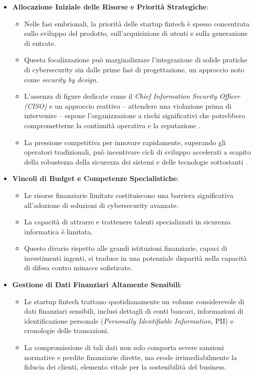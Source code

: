 \begin{itemize}
    \item \textbf{Allocazione Iniziale delle Risorse e Priorità Strategiche}: 
    \begin{itemize}
        \item Nelle fasi embrionali, la priorità delle startup fintech è spesso concentrata sullo sviluppo del prodotto, sull'acquisizione di utenti e sulla generazione di entrate.
        \item Questa focalizzazione può marginalizzare l'integrazione di solide pratiche di cybersecurity sin dalle prime fasi di progettazione, un approccio noto come \textit{security by design}.
        \item L'assenza di figure dedicate come il \textit{Chief Information Security Officer (CISO)} e un approccio reattivo – attendere una violazione prima di intervenire – espone l'organizzazione a rischi significativi che potrebbero comprometterne la continuità operativa e la reputazione \cite{Kaur2021}.
        \item La pressione competitiva per innovare rapidamente, superando gli operatori tradizionali, può incentivare cicli di sviluppo accelerati a scapito della robustezza della sicurezza dei sistemi e delle tecnologie sottostanti \cite{dasawat2023cyber}.
    \end{itemize}
    
    \item \textbf{Vincoli di Budget e Competenze Specialistiche}:
    \begin{itemize}
        \item Le risorse finanziarie limitate costituiscono una barriera significativa all'adozione di soluzioni di cybersecurity avanzate.
        \item La capacità di attrarre e trattenere talenti specializzati in sicurezza informatica è limitata.
        \item Questo divario rispetto alle grandi istituzioni finanziarie, capaci di investimenti ingenti, si traduce in una potenziale disparità nella capacità di difesa contro minacce sofisticate.
    \end{itemize}
    
    \item \textbf{Gestione di Dati Finanziari Altamente Sensibili}:
    \begin{itemize}
        \item Le startup fintech trattano quotidianamente un volume considerevole di dati finanziari sensibili, inclusi dettagli di conti bancari, informazioni di identificazione personale (\textit{Personally Identifiable Information}, PII) e cronologie delle transazioni.
        \item La compromissione di tali dati non solo comporta severe sanzioni normative e perdite finanziarie dirette, ma erode irrimediabilmente la fiducia dei clienti, elemento vitale per la sostenibilità del business.
    \end{itemize}
    

\end{itemize}
